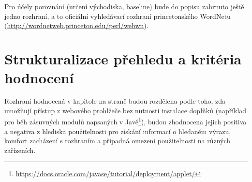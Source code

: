 \documentclass[a4paper, 11pt, oneside]{book}
\newcommand{\itNameRef}[1]{\textit{\nameref{#1}}}
\begin{document}

				Pro účely porovnání (určení východiska, baseline) bude do popisu zahrnuto ještě jedno rozhraní, a to oficiální vyhledávací rozhraní princetonského WordNetu (\url{http://wordnetweb.princeton.edu/perl/webwn}). 

			\section{Strukturalizace přehledu a kritéria hodnocení}
			\label{cha:structhodnoc}

				Rozhraní hodnocená v kapitole \itNameRef{cha:porovnani} na straně \pageref{cha:porovnani} budou rozdělena podle toho, zda umožňují přístup z webového prohlžeče bez nutnosti instalace doplňků (například pro běh zásuvných modulů napsaných v Javě\footnote{\url{https://docs.oracle.com/javase/tutorial/deployment/applet/}}), budou zhodnocena jejich positiva a negativa z hlediska použitelnosti pro získání informací o hledaném výrazu, komfort zacházení s rozhraním a případná omezení použitelnosti na různých zařízeních. 
\end{document}
